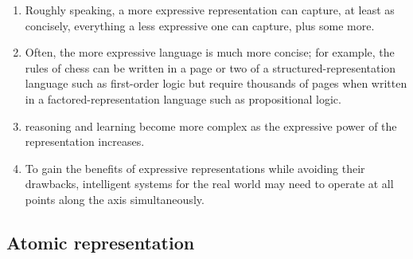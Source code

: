 \begin{enumerate}
    \item Roughly speaking, a more expressive representation can capture, at least as concisely, everything a less expressive one can capture, plus some more.
    \hfill \cite{ai/book/Artificial-Intelligence-A-Modern-Approach/Russell-Norvig}

    \item Often, the more expressive language is much more concise; for example, the rules of chess can be written in a page or two of a structured-representation language such as first-order logic but require thousands of pages when written in a factored-representation language such as propositional logic.
    \hfill \cite{ai/book/Artificial-Intelligence-A-Modern-Approach/Russell-Norvig}

    \item reasoning and learning become more complex as the expressive power of the representation increases.
    \hfill \cite{ai/book/Artificial-Intelligence-A-Modern-Approach/Russell-Norvig}

    \item To gain the benefits of expressive representations while avoiding their drawbacks, intelligent systems for the real world may need to operate at all points along the axis simultaneously.
    \hfill \cite{ai/book/Artificial-Intelligence-A-Modern-Approach/Russell-Norvig}
\end{enumerate}






\subsection{Atomic representation}


